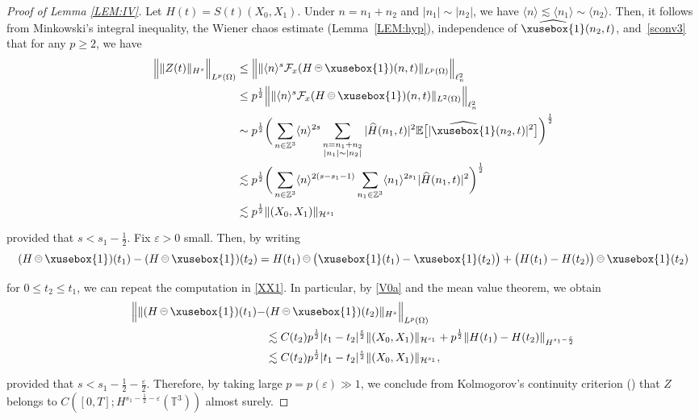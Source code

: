 \documentclass[%
11pt,  reqno]{amsart}
\def\<#1>{\xusebox{#1}}
\newcommand{\pe}{\mathbin{\scaleobj{0.7}{\tikz \draw (0,0) node[shape=circle,draw,inner sep=0pt,minimum size=8.5pt] {\scriptsize  $=$};}}}
\newcommand{\1}{\hspace{0.2mm}\text{I}\hspace{0.2mm}}
\newcommand{\noi}{\noindent}
\newcommand{\Z}{\mathbb{Z}}
\newcommand{\T}{\mathbb{T}}
\newcommand{\E}{\mathbb{E}}
\newcommand{\F}{\mathcal{F}}
\newcommand{\eps}{\varepsilon}
\newcommand{\ft}{\widehat}
\renewcommand{\l}{\ell}
\renewcommand{\O}{\Omega}
\newcommand{\les}{\lesssim}
\newcommand{\jb}[1]
{\langle #1 \rangle}
\renewcommand{\H}{\mathcal{H}}
\numberwithin{equation}{section}
\numberwithin{theorem}{section}
\begin{document}
\begin{proof}[Proof of Lemma \ref{LEM:IV}]
Let $H(t) = S(t) (X_0, X_1)$.
Under
$n = n_1 + n_2$ and $|n_1|\sim |n_2|$, 
we have $\jb{n} \les \jb{n_1} \sim \jb{n_2}$.
Then, it follows from   Minkowski's integral inequality, 
the Wiener chaos estimate (Lemma~\ref{LEM:hyp}), 
independence of $\ft{\<1>}(n_2, t)$, and~\eqref{sconv3}
that for any $p \geq 2$,  we have
\begin{align}
\Big\|\| Z (t) \|_{H^s} \Big\|_{L^p(\O)}
& \le \Big\| \| \jb{n}^{s} \F_x (H \pe \<1>) (n, t) \|_{L^p(\O)} \Big\|_{\l^2_n}\notag\\
& \leq p^\frac{1}{2}
 \Big\| \| \jb{n}^{s} \F_x (H \pe \<1>) (n, t) \|_{L^2(\O)} \Big\|_{\l^2_n}\notag\\
&  \sim p^\frac{1}{2}  
\bigg(\sum_{n \in \Z^3} 
\jb{n}^{2s}
\sum_{\substack{n = n_1 + n_2\\|n_1|\sim |n_2|}}
 |\ft H (n_1, t)|^2 
\E\big[|\ft{\<1>}(n_2, t)|^2 \big] \bigg)^\frac{1}{2}\notag\\
&  \les   p^\frac{1}{2}
\bigg( \sum_{n \in \Z^3} 
\jb{n}^{2(s - s_1 - 1)}
\sum_{n_1 \in \Z^3}
 \jb{n_1}^{2s_1} |\ft H (n_1, t)|^2 \bigg)^\frac{1}{2}
\notag\\
& \les  p^\frac{1}{2}
\| (X_0, X_1) \|_{\H^{s_1}}
\label{XX1}
\end{align}

\noi
provided that $s < s_1 - \frac 12$.
Fix $\eps > 0$ small.
Then, 
by writing
\[(H \pe \<1>) (t_1)- (H \pe \<1>) (t_2)
= H(t_1) \pe \big(\<1> (t_1) - \<1>(t_2)\big)
+ \big(H(t_1) - H(t_2) \big) \pe \<1> (t_2)\]

\noi
for $0 \leq t_2 \leq t_1$, 
we can repeat the computation in \eqref{XX1}.
In particular, by 
 \eqref{V0a} and the mean value theorem, we obtain
\begin{align*}
\Big\|\| (H \pe \<1>) (t_1)  - & (H \pe \<1>) (t_2) \|_{H^s} \Big\|_{L^p(\O)}\\
& \les  C(t_2) p^\frac{1}{2} |t_1 - t_2|^\frac{\eps}{2}
\| (X_0, X_1) \|_{\H^{s_1}}
+ p^\frac{1}{2} \| H (t_1) - H (t_2) \|_{H^{s_1-\frac{\eps}{2}}}\\
& \les  C(t_2) p^\frac{1}{2} |t_1 - t_2|^\frac{\eps}{2}
\| (X_0, X_1) \|_{\H^{s_1}}, 
\end{align*}

\noi
provided that $s < s_1 - \frac 12 - \frac{\eps}{2}$.
Therefore, by taking large $p = p(\eps) \gg1 $, 
we conclude from Kolmogorov's continuity criterion
(\cite[Theorem 8.2]{Bass})
that 
$Z$ belongs to 
$C([0,T];H^{ s_1 - \frac 12 -\eps}(\T^3))$
almost surely.
\end{proof}
	
\end{document}
